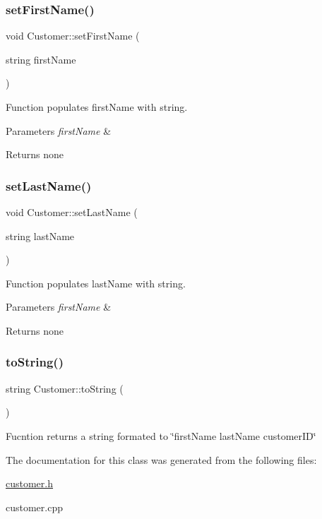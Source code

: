 \subsubsection{\texorpdfstring{set\+First\+Name()}{setFirstName()}}
{\footnotesize\ttfamily void Customer\+::set\+First\+Name (\begin{DoxyParamCaption}\item[{string}]{first\+Name }\end{DoxyParamCaption})}

Function populates first\+Name with string. 
\begin{DoxyParams}{Parameters}
{\em first\+Name} & \\
\hline
\end{DoxyParams}
\begin{DoxyReturn}{Returns}
none 
\end{DoxyReturn}
\mbox{\label{class_customer_a16bda3871286ed4ff13400dbd988790a}} 
\subsubsection{\texorpdfstring{set\+Last\+Name()}{setLastName()}}
{\footnotesize\ttfamily void Customer\+::set\+Last\+Name (\begin{DoxyParamCaption}\item[{string}]{last\+Name }\end{DoxyParamCaption})}

Function populates last\+Name with string. 
\begin{DoxyParams}{Parameters}
{\em first\+Name} & \\
\hline
\end{DoxyParams}
\begin{DoxyReturn}{Returns}
none 
\end{DoxyReturn}
\mbox{\label{class_customer_a09a36773263493f72efc4b3f02648c03}} 
\subsubsection{\texorpdfstring{to\+String()}{toString()}}
{\footnotesize\ttfamily string Customer\+::to\+String (\begin{DoxyParamCaption}{ }\end{DoxyParamCaption})}

Fucntion returns a string formated to \char`\"{}first\+Name last\+Name customer\+I\+D\char`\"{} 

The documentation for this class was generated from the following files\+:\begin{DoxyCompactItemize}
\item 
\hyperlink{customer_8h}{customer.\+h}\item 
customer.\+cpp\end{DoxyCompactItemize}
